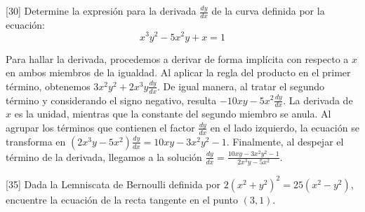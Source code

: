 \documentclass[11pt,paper=a4,answers, addpoints]{exam}
\begin{document}
\begin{questions}

[30]
Determine la expresión para la derivada $\frac{dy}{dx}$ de la curva definida por la ecuación:
\[ x^3y^2 - 5x^2y + x = 1 \]

\begin{solution}
Para hallar la derivada, procedemos a derivar de forma implícita con respecto a $x$ en ambos miembros de la igualdad. Al aplicar la regla del producto en el primer término, obtenemos $3x^2y^2 + 2x^3y \frac{dy}{dx}$. De igual manera, al tratar el segundo término y considerando el signo negativo, resulta $-10xy - 5x^2 \frac{dy}{dx}$. La derivada de $x$ es la unidad, mientras que la constante del segundo miembro se anula. Al agrupar los términos que contienen el factor $\frac{dy}{dx}$ en el lado izquierdo, la ecuación se transforma en $(2x^3y - 5x^2)\frac{dy}{dx} = 10xy - 3x^2y^2 - 1$. Finalmente, al despejar el término de la derivada, llegamos a la solución $\frac{dy}{dx} = \frac{10xy - 3x^2y^2 - 1}{2x^3y - 5x^2}$.
\end{solution}

[35]
Dada la Lemniscata de Bernoulli definida por $2(x^2+y^2)^2 = 25(x^2-y^2)$, encuentre la ecuación de la recta tangente en el punto $(3, 1)$.

\begin{center}
\hfill
{}
\end{center}


\end{questions}
\end{document}
